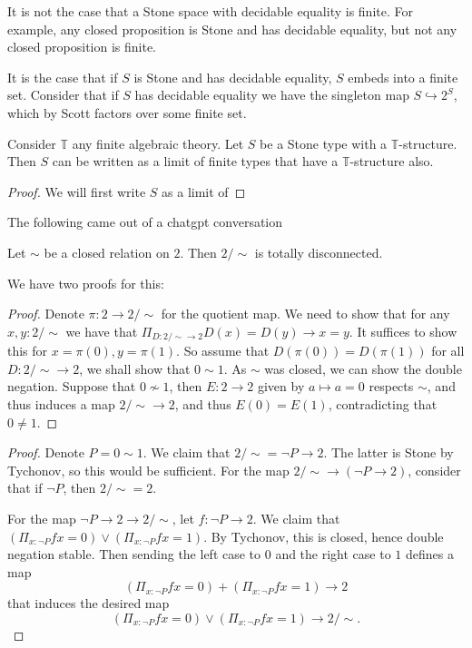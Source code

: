 \begin{remark}
  It is not the case that a Stone space with decidable equality is finite. For example, any closed proposition is Stone and has decidable equality, but not any closed proposition is finite. 

  It is the case that if $S$ is Stone and has decidable equality, $S$ embeds into a finite set. Consider that if $S$ has decidable equality we have the singleton map $S\hookrightarrow 2^S$, which by Scott factors over some finite set. 
\end{remark}

\begin{theorem}
  Consider $\mathbb T$ any finite algebraic theory. Let $S$ be a Stone type with a $\mathbb T$-structure. Then $S$ can be written as a limit of finite types that have a $\mathbb T$-structure also. 
\end{theorem}
\begin{proof}
  We will first write $S$ as a limit of 
\end{proof}

The following came out of a chatgpt conversation
\begin{lemma}
  Let $\sim$ be a closed relation on $2$. 
  Then $2/\sim$ is totally disconnected.
\end{lemma}
We have two proofs for this:
\begin{proof}
  Denote $\pi : 2 \to 2/\sim$ for the quotient map. 
  We need to show that for any $x,y:2/\sim$ we have that $\Pi_{D:2/\sim \to 2} D(x) = D(y) \to x = y$. It suffices to show this for $x= \pi(0), y = \pi(1)$.
  So assume that $D(\pi(0)) = D(\pi(1))$ for all $D: 2/\sim \to 2$, we shall show that $0\sim 1$. 
As $\sim$ was closed, we can show the double negation. 
  Suppose that $0\nsim 1$, then $E: 2\to 2$ given by $a \mapsto a = 0$ respects $\sim$, and thus induces a map $2/\sim\to 2$, and thus $E(0) = E(1)$, contradicting that $0 \neq 1$. 
\end{proof}
\begin{proof}
  Denote $P = 0 \sim 1$. 
  We claim that $2/\sim = \neg P \to 2$. 
  The latter is Stone by Tychonov, so this would be sufficient. 
  For the map $2/\sim \to (\neg P \to 2)$, consider that if $\neg P$, then $2/\sim = 2$. 

  For the map $\neg P \to 2\to 2/\sim$, let $f:\neg P \to 2$. 
  We claim that 
  $(\Pi_{x : \neg P} fx = 0) \vee (\Pi_{x : \neg P} fx = 1)$. By Tychonov, this is closed, hence double negation stable. 
  Then sending the left case to $0$ and the right case to $1$ defines a map
  $$
  (\Pi_{x : \neg P} fx = 0) + (\Pi_{x : \neg P} fx = 1) \to 2
  $$
  that induces the desired map
  $$
  (\Pi_{x : \neg P} fx = 0) \vee (\Pi_{x : \neg P} fx = 1) \to 2/\sim.
  $$
\end{proof}

